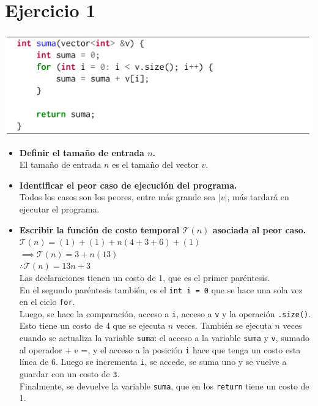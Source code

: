 \documentclass[12 pt]{article}
\begin{document}
\section*{Ejercicio 1}
    \begin{center}
        \includegraphics[width=0.7 \linewidth]{img/ej1.png}
    \end{center}
    \begin{itemize}
        \item \textbf{Definir el tamaño de entrada $n$.} \\
        El tamaño de entrada $n$ es el tamaño del vector $v$.
        \item \textbf{Identificar el peor caso de ejecución del programa.} \\
        Todos los casos son los peores, entre más grande sea $|v|$, más tardará en ejecutar el programa.
        \item \textbf{Escribir la función de costo temporal $\mathcal{T}(n)$ asociada al peor caso.} \\
        \(\mathcal{T}(n) = (1) + (1) + n(4 + 3 + 6) + (1)\) \\
        \(\implies \mathcal{T}(n) = 3 + n(13)\) \\
        \(\therefore \mathcal{T}(n) = 13n+3\) \\
        Las declaraciones tienen un costo de 1, que es el primer paréntesis. \\
        En el segundo paréntesis también, es el \texttt{int i = 0} que se hace una sola vez en el ciclo \texttt{for}. \\
        Luego, se hace la comparación, acceso a \texttt{i}, acceso a \texttt{v} y la operación \texttt{.size()}. Esto tiene un costo de 4 que se ejecuta $n$ veces. También se ejecuta $n$ veces cuando se actualiza la variable \texttt{suma}: el acceso a la variable \texttt{suma} y \texttt{v}, sumado al operador + e =, y el acceso a la posición \texttt{i} hace que tenga un costo esta línea de 6. Luego se incrementa \texttt{i}, se accede, se suma uno y se vuelve a guardar con un costo de \texttt{3}. \\
        Finalmente, se devuelve la variable \texttt{suma}, que en los \texttt{return} tiene un costo de 1.

\end{itemize}
\end{document}
